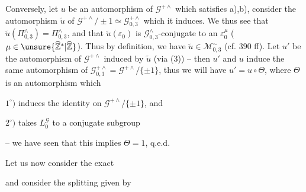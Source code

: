 Conversely, let $u$ be an automorphism of $\mathcal{G}^{+\wedge}$ which
satisfies a),b), consider the automorphism $\widetilde{u}$ of
$\mathcal{G}^{+\wedge}/\!\pm1\simeq\mathcal{G}_{0,3}^{+\wedge}$
which it induces. We thus see
that $\widetilde{u}(\Pi_{0,3}^{\wedge})=\Pi_{0,3}^{\wedge}$, and that
$\widetilde{u}(\varepsilon_{0})$ is $\mathcal{G}_{0,3}^{\wedge}$-conjugate
to an $\varepsilon_{0}^{\mu}$ ($\mu\in\unsure{\widehat{\mathbb{Z}}^{*}|\widehat{\mathbb{Z}}}$).
 Thus by
definition, we have $\widetilde{u}\in\mathcal{M}_{0,3}^{\sim}$
(cf.  390 ff).
Let $u'$ be the automorphism of $\mathcal{G}^{+\wedge}$ induced by $\widetilde{u}$
(via (3)) -- then $u'$ and $u$ induce the same
automorphism of $\mathcal{G}_{0,3}^{+\wedge}=\mathcal{G}^{+\wedge}/\{\pm1\}$,
thus we will have $u'=u\circ\Theta$, where
$\Theta$ is an automorphism which

$1^\circ)$ induces the identity on $\mathcal{G}^{+\wedge}/\{\pm1\}$, and

$2^\circ)$ takes $L_{0}^{\mathcal{G}}$ to a conjugate subgroup

-- we have seen that this implies $\Theta=1$, q.e.d.

Let us now consider the exact 




and consider the splitting given by


